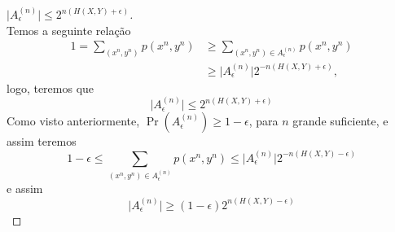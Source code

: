 \begin{proof}[$\vert A_{\epsilon}^{(n)} \vert \leq 2^{n(H(X,Y)+\epsilon)}$]\ \\
  Temos a seguinte relação
  \begin{subequations}
    \begin{align}
    1 = \sum_{(x^n , y^n)} p(x^n, y^n) &\geq \sum_{(x^n , y^n) \in A_{\epsilon}^{(n)}} p(x^n, y^n) \\
           &\geq \vert A_{\epsilon}^{(n)} \vert 2^{-n(H(X,Y)+\epsilon)}  ,
    \end{align}
  \end{subequations}
  logo, teremos que
  \begin{equation}
  \vert A_{\epsilon}^{(n)} \vert \leq 2^{n(H(X,Y)+\epsilon)}
  \end{equation}
  Como visto anteriormente, $\Pr(A_{\epsilon}^{(n)}) \geq 1 - \epsilon$, para $n$ grande suficiente, e assim teremos
  \begin{equation}
  1 - \epsilon \leq \sum_{(x^n , y^n) \in A_{\epsilon}^{(n)}} p(x^n, y^n) \leq \vert A_{\epsilon}^{(n)} \vert 2^{-n(H(X,Y)-\epsilon)}
  \end{equation}
  e assim
  \begin{equation}
  \vert A_{\epsilon}^{(n)} \vert \geq (1 - \epsilon) 2^{n(H(X,Y)-\epsilon)}
  \end{equation}
\end{proof}


